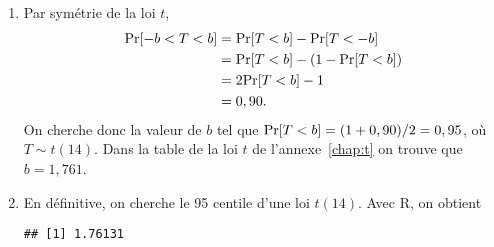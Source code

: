 \begin{solution}{2.12}
    \begin{enumerate}
    \item Par symétrie de la loi $t$,
      \begin{align*}
        \mathrm{Pr} [ -b < T < b ]
        &= \mathrm{Pr} [ T < b ] - \mathrm{Pr} [ T < -b ] \\
        &= \mathrm{Pr} [ T < b ] - (1 - \mathrm{Pr} [ T < b ]) \\
        &= 2 \mathrm{Pr} [ T < b ] - 1 \\
        &= 0,90.
      \end{align*}
      On cherche donc la valeur de $b$ tel que $\mathrm{Pr} [ T < b ] = (1 +
      0,90)/2 = 0,95$, où $T \sim t(14)$. Dans la table de la loi $t$
      de l'annexe~\ref{chap:t} on trouve que $b = 1,761$.
    \item En définitive, on cherche le 95{\ieme} centile d'une loi
      $t(14)$. Avec \textsf{R}, on obtient
\begin{knitrout}
\color{fgcolor}\begin{kframe}
\begin{alltt}
\hlstd{(}\hlstd{,} \hlstd{)}
\end{alltt}
\begin{verbatim}
## [1] 1.76131
\end{verbatim}
\end{kframe}
\end{knitrout}
    \end{enumerate}
  
\end{solution}
